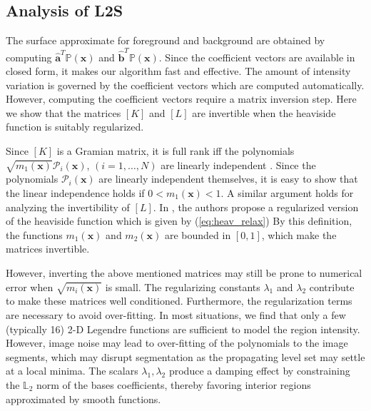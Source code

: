 \subsection{Analysis of L2S}
The surface approximate for foreground and background are obtained by computing $\hat{\textbf{a}}^T\mathbb{P}(\textbf{x})$ and $\hat{\textbf{b}}^T\mathbb{P}(\textbf{x})$. Since the coefficient vectors are available in closed form, it makes our algorithm fast and effective. The amount of intensity variation is governed by the coefficient vectors which are computed automatically. However, computing the coefficient vectors require a matrix inversion step. Here we show that the matrices $\left[K\right]$ and $\left[L\right]$ are invertible when the heaviside function is suitably regularized.

Since $\left[K\right]$ is a Gramian matrix, it is full rank iff the polynomials $\sqrt{m_1(\textbf{x})}\mathcal{P}_i(\textbf{x})$, $(i=1,\ldots,N)$ are linearly independent \cite{gramian}. Since the polynomials $\mathcal{P}_i(\textbf{x})$ are linearly independent themselves, it is easy to show that the linear independence holds if $0< m_1(\textbf{x})< 1$. A similar argument holds for analyzing the invertibility of $\left[L\right]$. In \cite{chan_vese}, the authors propose a regularized version of the heaviside function which is given by (\ref{eq:heav_relax})
By this definition, the functions $m_1(\textbf{x})$ and $m_2(\textbf{x})$ are bounded in $\left[0,1\right]$, which make the matrices invertible. 

However, inverting the above mentioned matrices may still be prone to numerical error  when $\sqrt{m_i(\textbf{x})}$ is small. The regularizing constants $\lambda_1$ and $\lambda_2$ contribute to make these matrices well conditioned. Furthermore, the regularization terms are necessary to avoid over-fitting. In most situations, we find that only a few (typically 16) 2-D Legendre functions are sufficient to model the region intensity. However, image noise may lead to over-fitting of the polynomials to the image segments, which may disrupt segmentation as the propagating level set may settle at a local minima. The scalars $\lambda_1,\lambda_2$ produce a damping effect by constraining the $\mathbb{L}_2$ norm of the bases coefficients, thereby favoring interior regions approximated by smooth functions. 

